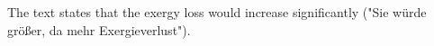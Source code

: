 The text states that the exergy loss would increase significantly ("Sie würde größer, da mehr Exergieverlust").